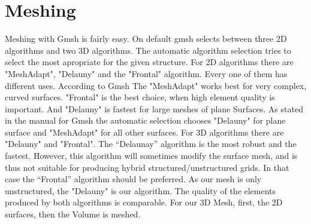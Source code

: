 \documentclass[preprint,journal]{vgtc}       %
\begin{document}
\section{Meshing}
Meshing with Gmsh is fairly easy. On default gmsh selects between three 2D algorithms and two 3D algorithms.
The automatic algorithm selection tries to select the most apropriate for the given structure.
For 2D algorithms there are "MeshAdapt", "Delauny" and the "Frontal" algorithm. Every one of them has different uses. According to Gmsh The "MeshAdapt" works best for very complex, curved surfaces. "Frontal" is the best choice, when high element quality is important. And "Delauny" is fastest for large meshes of plane Surfaces.
As stated in the manual for Gmsh the automatic selection chooses "Delauny" for plane surface and "MeshAdapt" for all other surfaces. 
For 3D algorithms there are "Delauny" and "Frontal". The “Delaunay” algorithm is the most robust and the fastest. However, this algorithm will sometimes modify the surface mesh, and is thus not suitable for producing hybrid structured/unstructured grids. In that case the “Frontal” algorithm should be preferred. As our mesh is only unstructured, the "Delauny" is our algorithm. The quality of the elements produced by both algorithms is comparable.
For our 3D Mesh, first, the 2D surfaces, then the Volume is meshed.
%	
\end{document}
